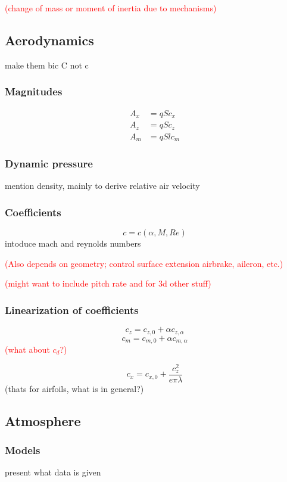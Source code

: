 \documentclass[10pt]{extarticle}
\numberwithin{equation}{subsection}
\newcommand{\todo}[1]{%
    \textcolor{red}{(#1)}%
}
\begin{document}
\todo{change of mass or moment of inertia due to mechanisms}

\subsection{Aerodynamics}
make them bic C not c
\subsubsection{Magnitudes}
\begin{align}
    A_x &= qSc_x \\
    A_z &= qSc_z \\
    A_m &= qSlc_m
\end{align}

\subsubsection{Dynamic pressure}
mention density, mainly to derive relative air velocity

\subsubsection{Coefficients}
\begin{equation}
    c = c(\alpha, M, Re)
\end{equation}
intoduce mach and reynolds numbers

\todo{Also depends on geometry; control surface extension airbrake, aileron, etc.}
\todo{might want to include pitch rate and for 3d other stuff}
\subsubsection{Linearization of coefficients}
\begin{equation}
    c_z = c_{z,0} + \alpha c_{z,\alpha}
\end{equation}
\begin{equation}
    c_m = c_{m,0} + \alpha c_{m,\alpha}
\end{equation}
\todo{what about $c_d$?}
\begin{equation}
    c_x = c_{x,0} + \frac{c_z^2}{e\pi\lambda}
\end{equation}
(thats for airfoils, what is in general?)

\subsection{Atmosphere}
\subsubsection{Models}
present what data is given
\end{document}
